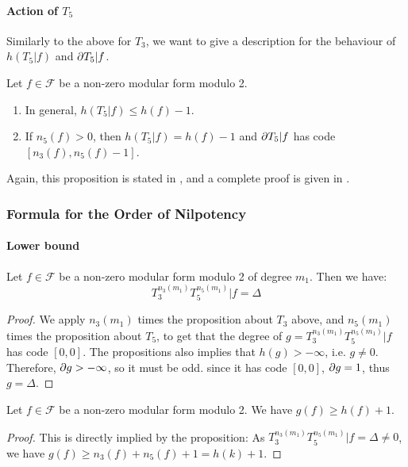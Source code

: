 \paragraph{Action of $T_5$}
Similarly to the above for $T_3$, we want to give a description for the behaviour of $h(T_5|f)$ and $\partial T_5|f$.
\label{propositionActionT5}
\begin{proposition}
	Let $f \in \mathcal{F}$ be a non-zero modular form modulo 2.
	\begin{enumerate}
		\item In general, $h(T_5|f) \leq h(f)-1$.
		\item If $n_5(f)>0$, then $h(T_5|f) = h(f)-1$ and $\partial T_5|f$ has code $\left[ n_3(f), n_5(f)-1 \right] $.
	\end{enumerate}
\end{proposition}
Again, this proposition is stated in \cite[§4]{OrdreNilpotenceOperateurHecke}, and a complete proof is given in \cite{ModularFormsMcGill}.



\subsubsection{Formula for the Order of Nilpotency}
\paragraph{Lower bound}
\begin{property}
	Let $f \in \mathcal{F}$ be a non-zero modular form modulo 2 of degree $m_1$.
	Then we have:
	$$
	T_3^{n_3(m_1)} T_5^{n_5(m_1)} | f = \Delta
	$$
\end{property}
\begin{proof}
	We apply $n_3(m_1)$ times the proposition about $T_3$ above, and $n_5(m_1)$ times the proposition about $T_5$, to get that the degree of $g = T_3^{n_3(m_1)}T_5^{n_5(m_1)}|f$ has code $\left[ 0,0 \right]$.
	The propositions also implies that $h(g) > -\infty$, i.e. $g \neq 0$.
	Therefore, $\partial g > -\infty$, so it must be odd. since it has code $\left[ 0,0 \right]$,  $\partial g = 1$, thus $g = \Delta$.
\end{proof}

\begin{corollary}
	Let $f \in \mathcal{F}$ be a non-zero modular form modulo 2.
	We have $g(f) \geq h(f) +1$.
\end{corollary}
\begin{proof}
	This is directly implied by the proposition:
	As $T_3^{n_3(m_1)}T_5^{n_5(m_1)}|f = \Delta \neq 0$, we have $g(f) \geq n_3(f)+n_5(f)+1 = h(k)+1$.
\end{proof}

